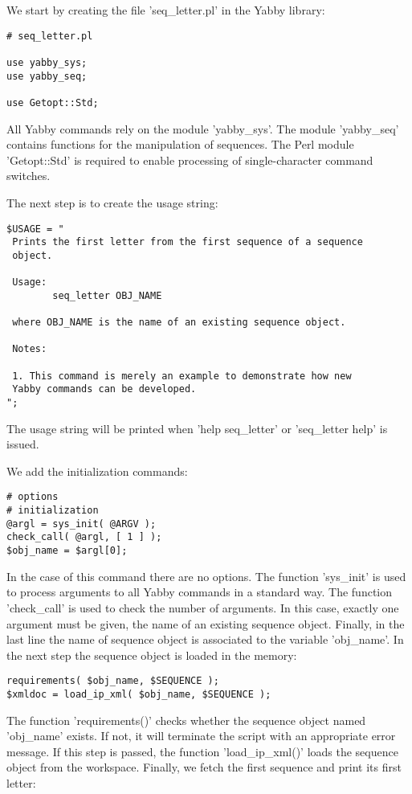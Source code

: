 We start by creating the file 'seq\_letter.pl' in the Yabby library:

\begin{verbatim}
# seq_letter.pl

use yabby_sys;
use yabby_seq;

use Getopt::Std;
\end{verbatim}

All Yabby commands rely on the module 'yabby\_sys'. The module 'yabby\_seq'
contains functions for the manipulation of sequences. The Perl module
'Getopt::Std' is required to enable processing of single-character
command switches.

The next step is to create the usage string:

\begin{verbatim}
$USAGE = "
 Prints the first letter from the first sequence of a sequence
 object. 

 Usage:
        seq_letter OBJ_NAME

 where OBJ_NAME is the name of an existing sequence object.

 Notes:

 1. This command is merely an example to demonstrate how new
 Yabby commands can be developed.
";
\end{verbatim}

The usage string will be printed when 'help seq\_letter' or
'seq\_letter help' is issued.

We add the initialization commands:

\begin{verbatim}
# options
# initialization
@argl = sys_init( @ARGV );
check_call( @argl, [ 1 ] );
$obj_name = $argl[0];
\end{verbatim}

In the case of this command there are no options. The function
'sys\_init' is used to process arguments to all Yabby commands
in a standard way. The function 'check\_call' is used to check
the number of arguments.  In this case, exactly one argument
must be given, the name of an existing sequence object.  Finally,
in the last line the name of sequence object is associated to
the variable 'obj\_name'. In the next step the sequence object
is loaded in the memory:
 
\begin{verbatim}
requirements( $obj_name, $SEQUENCE );
$xmldoc = load_ip_xml( $obj_name, $SEQUENCE );
\end{verbatim}

The function 'requirements()' checks whether the sequence object
named 'obj\_name' exists. If not, it will terminate the script
with an appropriate error message. If this step is passed, the
function 'load\_ip\_xml()' loads the sequence object from the
workspace. Finally, we fetch the first sequence and print its
first letter:


